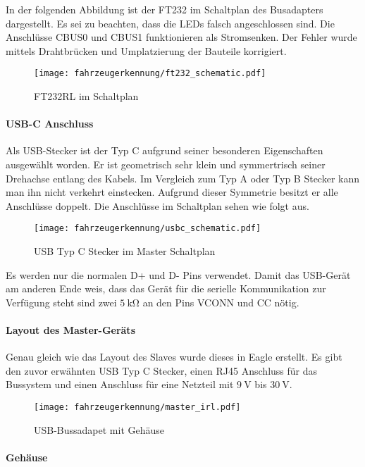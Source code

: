 In der folgenden Abbildung ist der FT232 im Schaltplan des Busadapters dargestellt. Es sei zu beachten, dass die LEDs falsch angeschlossen sind. Die Anschlüsse CBUS0 und CBUS1 funktionieren als Stromsenken. 
Der Fehler wurde mittels Drahtbrücken und Umplatzierung der Bauteile korrigiert.
\begin{figure}[H]
    \centering
    \texttt{[image: fahrzeugerkennung/ft232\_schematic.pdf]}
    \caption{FT232RL im Schaltplan}
\end{figure}

\paragraph{USB-C Anschluss}\mbox{} 

Als USB-Stecker ist der Typ C aufgrund seiner besonderen Eigenschaften ausgewählt worden. Er ist geometrisch sehr klein und symmertrisch seiner Drehachse entlang des Kabels. Im Vergleich zum Typ A oder Typ B Stecker 
kann man ihn nicht verkehrt einstecken. Aufgrund dieser Symmetrie besitzt er alle Anschlüsse doppelt. Die Anschlüsse im Schaltplan sehen wie folgt aus.

\begin{figure}[H]
    \centering
    \texttt{[image: fahrzeugerkennung/usbc\_schematic.pdf]}
    \caption{USB Typ C Stecker im Master Schaltplan}
\end{figure}

Es werden nur die normalen D+ und D- Pins verwendet. Damit das USB-Gerät am anderen Ende weis, dass das Gerät für die serielle Kommunikation zur Verfügung steht sind zwei $\SI{5}{\kilo\ohm}$ an den Pins VCONN und CC nötig.

\paragraph{Layout des Master-Geräts} \mbox{} 

Genau gleich wie das Layout des Slaves wurde dieses in Eagle erstellt. Es gibt den zuvor erwähnten USB Typ C Stecker, einen RJ45 Anschluss für das Bussystem und einen Anschluss für eine Netzteil mit $\SI{9}{\volt}$ bis 
$\SI{30}{\volt}$.

\begin{figure}[H]
    \centering
    \texttt{[image: fahrzeugerkennung/master\_irl.pdf]}
    \caption{USB-Bussadapet mit Gehäuse}
\end{figure}

\paragraph{Gehäuse}\mbox{} 

